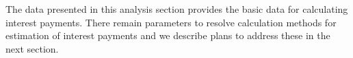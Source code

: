 The data presented in this analysis section provides the basic data for calculating interest payments.  There remain parameters to resolve calculation methods for estimation of interest payments and we describe plans to address these in the next section.


%
